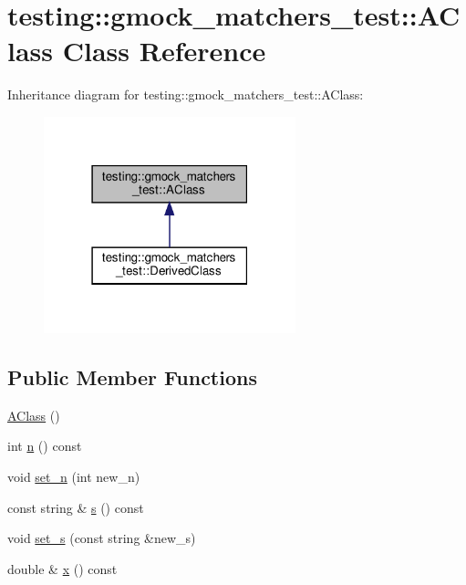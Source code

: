 \hypertarget{classtesting_1_1gmock__matchers__test_1_1_a_class}{}\section{testing\+:\+:gmock\+\_\+matchers\+\_\+test\+:\+:A\+Class Class Reference}
\label{classtesting_1_1gmock__matchers__test_1_1_a_class}


Inheritance diagram for testing\+:\+:gmock\+\_\+matchers\+\_\+test\+:\+:A\+Class\+:
\nopagebreak
\begin{figure}[H]
\begin{center}
\leavevmode
\includegraphics[width=207pt]{classtesting_1_1gmock__matchers__test_1_1_a_class__inherit__graph}
\end{center}
\end{figure}
\subsection*{Public Member Functions}
\begin{DoxyCompactItemize}
\item 
\hyperlink{classtesting_1_1gmock__matchers__test_1_1_a_class_ac43d717a80bb6fad8c77dc36f963ca88}{A\+Class} ()
\item 
int \hyperlink{classtesting_1_1gmock__matchers__test_1_1_a_class_add84ab9ef4a6bbe78719a9528bf6fb90}{n} () const
\item 
void \hyperlink{classtesting_1_1gmock__matchers__test_1_1_a_class_a3181466cec6faa5ab3c6bc5c4dbf67b2}{set\+\_\+n} (int new\+\_\+n)
\item 
const string \& \hyperlink{classtesting_1_1gmock__matchers__test_1_1_a_class_a0ca922c6dbf894df355c1ce2082468ba}{s} () const
\item 
void \hyperlink{classtesting_1_1gmock__matchers__test_1_1_a_class_a131c5d2da4b5984f5af3fd84898eaf09}{set\+\_\+s} (const string \&new\+\_\+s)
\item 
double \& \hyperlink{classtesting_1_1gmock__matchers__test_1_1_a_class_ade61d438cb535d71d0dcc17a1d5bd7cd}{x} () const
\end{DoxyCompactItemize}



